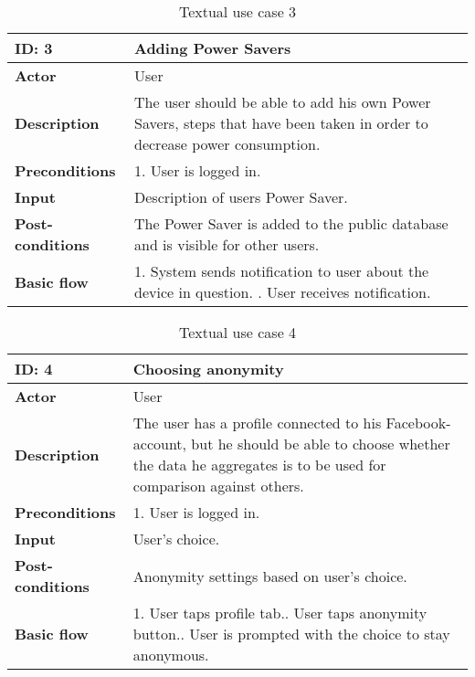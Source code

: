 \begin{table}[H]
\begin{tabular}{|l|p{11.7cm}|}
\hline
\textbf{ID: }3&\textbf{Adding Power Savers}
\\\hline
\textbf{Actor} &User
\\\hline
\textbf{Description}&
The user should be able to add his own Power Savers, steps that have been taken in order to decrease power consumption.\\\hline
\textbf{Preconditions}&
1. User is logged in.\\\hline
\textbf{Input}&
Description of users Power Saver.
\\\hline
\textbf{Post-conditions}& 
The Power Saver is added to the public database and is visible for other users.
\\\hline
\textbf{Basic flow}&
1. System sends notification to user about the device in question. \newline
2. User receives notification.
\\\hline
\end{tabular}
\caption{Textual use case 3}
\end{table}


\begin{table}[H]
\begin{tabular}{|l|p{11.7cm}|}
\hline
\textbf{ID: }4&\textbf{Choosing anonymity}
\\\hline
\textbf{Actor} &User
\\\hline
\textbf{Description}&
The user has a profile connected to his Facebook-account, but he should be able to choose whether the data he aggregates is to be used for comparison against others.\\\hline
\textbf{Preconditions}&
1. User is logged in.\\\hline
\textbf{Input}&
User's choice.
\\\hline
\textbf{Post-conditions}& 
Anonymity settings based on user's choice.
\\\hline
\textbf{Basic flow}&
1. User taps profile tab.\newline
2. User taps anonymity button.\newline
3. User is prompted with the choice to stay anonymous.
\\\hline
\end{tabular}
\caption{Textual use case 4}
\end{table}

